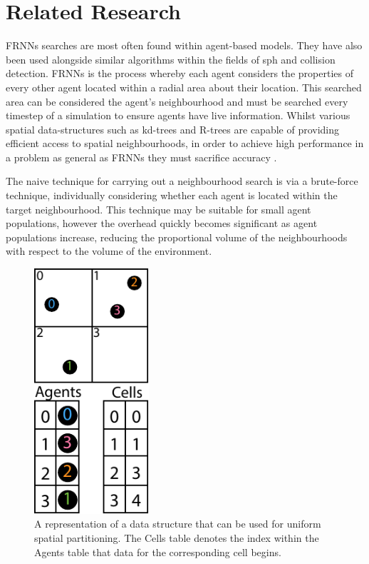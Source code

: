 \vspace{-0.3cm}
\section{Related Research\label{sec:related-work}}
\vspace{-0.4cm}
  FRNNs searches are most often found within agent-based models. They have also been used alongside similar algorithms within the fields of \gls{sph} and collision detection. FRNNs is the process whereby each agent considers the properties of every other agent located within a radial area about their location. This searched area can be considered the agent’s neighbourhood and must be searched every timestep of a simulation to ensure agents have live information. Whilst various spatial data-structures such as kd-trees and R-trees are capable of providing efficient access to spatial neighbourhoods, in order to achieve high performance in a problem as general as FRNNs they must sacrifice accuracy \cite{KS*14}.

  The naive technique for carrying out a neighbourhood search is via a brute-force technique, individually considering whether each agent is located within the target neighbourhood. This technique may be suitable for small agent populations, however the overhead quickly becomes significant as agent populations increase, reducing the proportional volume of the neighbourhoods with respect to the volume of the environment.
  
\begin{figure}
\vspace{-0.4cm}
  \begin{center}
    \includegraphics[width=0.38\textwidth]{../resources/usp/usp.pdf}
  \end{center}
\vspace{-0.4cm}
  \caption{\label{fig:usp} A representation of a data structure that can be used for uniform spatial partitioning. The Cells table denotes the index within the Agents table that data for the corresponding cell begins.}
\end{figure}
  
